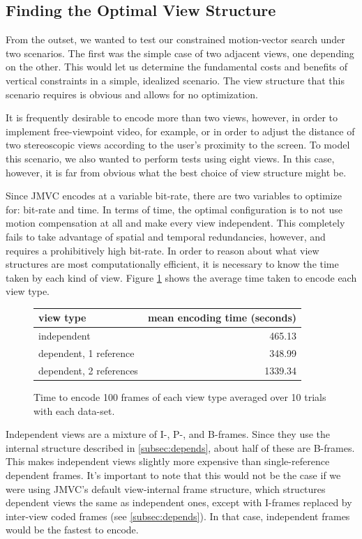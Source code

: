 \documentclass{sig-alternate-05-2015}
\begin{document}
\subsection{Finding the Optimal View Structure}
\label{subsec:optimal}
From the outset, we wanted to test our constrained motion-vector search under
two scenarios. The first was the simple case of two adjacent views,
one depending on the other. This would let us determine the fundamental costs
and benefits of vertical constraints in a simple, idealized scenario. The view
structure that this scenario requires is obvious and allows for no
optimization.

It is frequently desirable to encode more than two views, however, in order to
implement free-viewpoint video, for example, or in order to adjust the distance
of two stereoscopic views according to the user's proximity to the screen. To
model this scenario, we also wanted to perform tests using eight views. In this
case, however, it is far from obvious what the best choice of view structure
might be.

Since JMVC encodes at a variable bit-rate, there are two variables to optimize
for: bit-rate and time. In terms of time, the optimal configuration is to not
use motion compensation at all and make every view independent. This completely
fails to take advantage of spatial and temporal redundancies, however, and
requires a prohibitively high bit-rate. In order to reason about what view
structures are most computationally efficient, it is necessary to know the
time taken by each kind of view. Figure \ref{fig:view-type-times} shows
the average time taken to encode each view type.

\begin{figure}
\centering
\begin{tabular}{|l|r|}
\hline
view type               & mean encoding time (seconds) \\
\hline
independent             & 465.13                       \\
dependent, 1 reference  & 348.99                       \\
dependent, 2 references & 1339.34                      \\
\hline
\end{tabular}
\caption{Time to encode 100 frames of each view type averaged over 10 trials
with each data-set.}
\label{fig:view-type-times}
\end{figure}

Independent views are a mixture of I-, P-, and B-frames. Since they use the
internal structure described in \ref{subsec:depends}, about half of these
are B-frames. This makes independent views slightly more expensive than
single-reference dependent frames. It's important to note that this would not be
the case if we were using JMVC's default view-internal frame structure, which
structures dependent views the same as independent ones, except with I-frames
replaced by inter-view coded frames (see \ref{subsec:depends}). In that case,
independent frames would be the fastest to encode.
\end{document}
